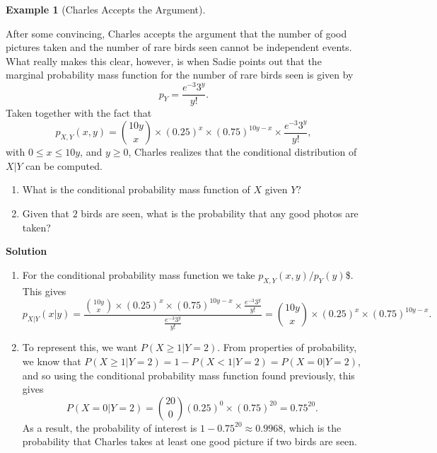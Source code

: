 \documentclass[
  letterpaper,
  DIV=11,
  numbers=noendperiod]{scrreprt}
\providecommand{\tightlist}{%
  \setlength{\itemsep}{0pt}\setlength{\parskip}{0pt}}\usepackage{longtable,booktabs,array}
\theoremstyle{definition}
\theoremstyle{definition}
\newtheorem{example}{Example}[chapter]
\theoremstyle{definition}
\theoremstyle{remark}
\begin{document}
\begin{example}[Charles Accepts the
Argument]\protect\hypertarget{exm-conditional-pmf}{}\label{exm-conditional-pmf}

After some convincing, Charles accepts the argument that the number of
good pictures taken and the number of rare birds seen cannot be
independent events. What really makes this clear, however, is when Sadie
points out that the marginal probability mass function for the number of
rare birds seen is given by \[p_{Y} = \frac{e^{-3}3^y}{y!}.\] Taken
together with the fact that
\[p_{X,Y}(x, y) = \binom{10y}{x}\times(0.25)^{x}\times(0.75)^{10y - x}\times\frac{e^{-3}3^y}{y!},\]
with \(0 \leq x \leq 10y\), and \(y \geq 0\), Charles realizes that the
conditional distribution of \(X|Y\) can be computed.

\begin{enumerate}
\def\labelenumi{\alph{enumi}.}
\tightlist
\item
  What is the conditional probability mass function of \(X\) given
  \(Y\)?
\item
  Given that \(2\) birds are seen, what is the probability that any good
  photos are taken?
\end{enumerate}

\begin{tcolorbox}[enhanced jigsaw, colback=white, colframe=quarto-callout-color-frame, arc=.35mm, leftrule=.75mm, rightrule=.15mm, opacityback=0, breakable, bottomrule=.15mm, left=2mm, toprule=.15mm]

\vspace{-3mm}\textbf{Solution}\vspace{3mm}

\begin{enumerate}
\def\labelenumi{\alph{enumi}.}
\item
  For the conditional probability mass function we take
  \(p_{X,Y}(x, y)/p_{Y}(y)\)\$. This gives
  \[p_{X|Y}(x|y) = \frac{\binom{10y}{x}\times(0.25)^{x}\times(0.75)^{10y - x}\times\frac{e^{-3}3^y}{y!}}{\frac{e^{-3}3^y}{y!}} = \binom{10y}{x}\times(0.25)^{x}\times(0.75)^{10y - x}.\]
\item
  To represent this, we want \(P(X \geq 1 | Y = 2)\). From properties of
  probability, we know that
  \(P(X \geq 1 | Y = 2) = 1 - P(X < 1 | Y = 2) = P(X = 0 | Y = 2)\), and
  so using the conditional probability mass function found previously,
  this gives
  \[P(X = 0 | Y = 2) = \binom{20}{0}(0.25)^{0}\times(0.75)^{20} = 0.75^{20}.\]
  As a result, the probability of interest is
  \(1-0.75^{20} \approx 0.9968\), which is the probability that Charles
  takes at least one good picture if two birds are seen.
\end{enumerate}

\end{tcolorbox}

\end{example}
\end{document}
